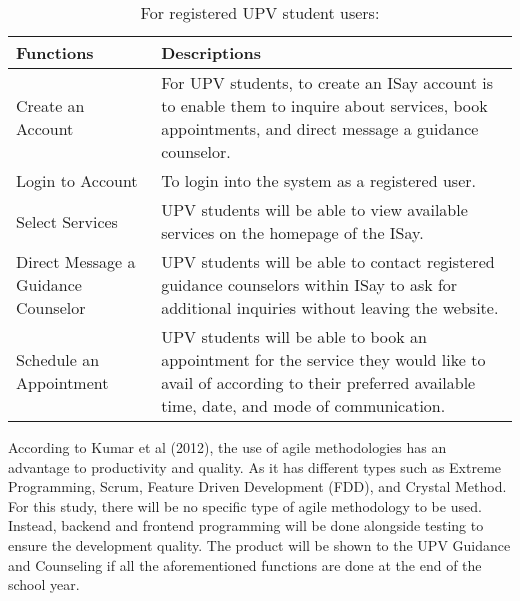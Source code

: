\begin{table}   %
\centering
\caption{For registered UPV student users:} \vspace{0.25em}
\begin{tabular}{|p{2in}|p{4in}|} \hline
\centering Functions & Descriptions\\ \hline
Create an Account       &   For UPV students, to create an ISay account is to enable them to inquire about services, book appointments, and direct message a guidance counselor.  \\ \hline
Login to Account  &  To login into the system as a registered user. \\ \hline
Select Services   & UPV students will be able to view available services on the homepage of the ISay.  \\ \hline
Direct Message a Guidance Counselor       &    UPV students will be able to contact registered guidance counselors within ISay to ask for additional inquiries without leaving the website.   \\ \hline
Schedule an Appointment  & UPV students will be able to book an appointment for the service they would like to avail of according to their preferred available time, date, and mode of communication.  \\ \hline
\end{tabular}
\label{tab:registeredstudents}
\end{table}


According to Kumar et al (2012), the use of agile methodologies has an advantage to productivity and quality. As it has different types such as Extreme Programming, Scrum, Feature Driven Development (FDD), and Crystal Method. For this study, there will be no specific type of agile methodology to be used. Instead, backend and frontend programming will be done alongside testing to ensure the development quality. The product will be shown to the UPV Guidance and Counseling if all the aforementioned functions are done at the end of the school year. 


